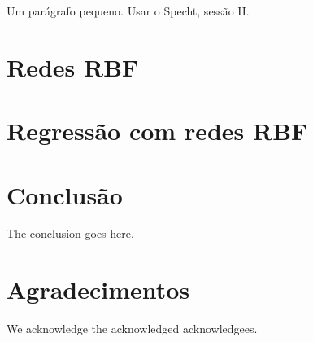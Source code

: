 \documentclass[conference]{IEEEtran}
\begin{document}
Um parágrafo pequeno. Usar o Specht, sessão II.

\section{Redes RBF}
\label{rbf}

\section{Regressão com redes RBF}
\label{resultados}

\section{Conclusão}
\label{conclusao}

The conclusion goes here.

\section*{Agradecimentos}
We acknowledge the acknowledged acknowledgees.




\end{document}
